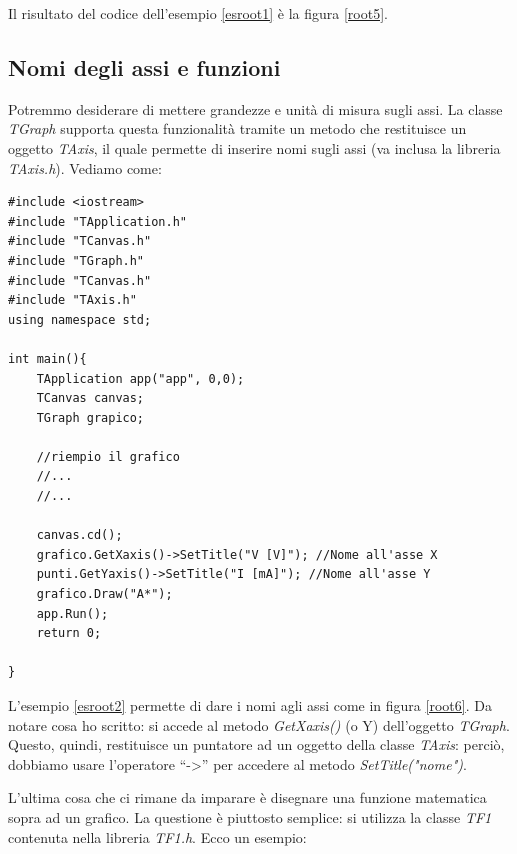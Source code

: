 Il risultato del codice dell'esempio \ref{esroot1} è la figura \ref{root5}.


\subsection{Nomi degli assi e funzioni}
Potremmo desiderare di mettere grandezze e unità di misura sugli assi. La classe \emph{TGraph} supporta questa funzionalità tramite un metodo che restituisce un oggetto \emph{TAxis}, il quale permette di inserire nomi sugli assi (va inclusa la libreria \emph{TAxis.h}). Vediamo come:
\begin{lstlisting}[label=esroot2]
#include <iostream>
#include "TApplication.h"
#include "TCanvas.h"
#include "TGraph.h"
#include "TCanvas.h"
#include "TAxis.h"
using namespace std;

int main(){
	TApplication app("app", 0,0);
	TCanvas canvas;
	TGraph grapico;
	
	//riempio il grafico
	//...
	//...
	
	canvas.cd();
	grafico.GetXaxis()->SetTitle("V [V]"); //Nome all'asse X
	punti.GetYaxis()->SetTitle("I [mA]"); //Nome all'asse Y
	grafico.Draw("A*");
	app.Run();
	return 0;
	
}
\end{lstlisting}

L'esempio \ref{esroot2} permette di dare i nomi agli assi come in figura \ref{root6}. Da notare cosa ho scritto: si accede al metodo \emph{GetXaxis()} (o Y) dell'oggetto \emph{TGraph}. Questo, quindi, restituisce un puntatore ad un oggetto della classe \emph{TAxis}: perciò, dobbiamo usare l'operatore ``->'' per accedere al metodo \emph{SetTitle("nome")}.

L'ultima cosa che ci rimane da imparare è disegnare una funzione matematica sopra ad un grafico. La questione è piuttosto semplice: si utilizza la classe \emph{TF1} contenuta nella libreria \emph{TF1.h}. Ecco un esempio:

